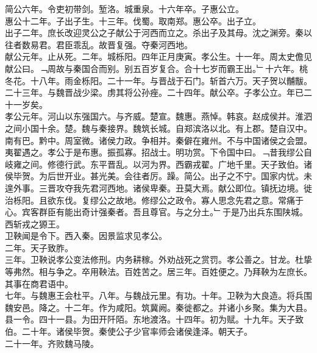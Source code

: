 \documentclass{zhvt-classic}
\begin{document}
\hspace*{2em}简公六年。令吏初带剑。堑洛。城重泉。十六年卒。子惠公立。\\
\hspace*{2em}惠公十二年。子出子生。十三年。伐蜀。取南郑。惠公卒。出子立。\\
\hspace*{2em}出子二年。庶长改迎灵公之子献公于河西而立之。杀出子及其母。沈之渊旁。秦以往者数易君。君臣乖乱。故晋复强。夺秦河西地。\\
\hspace*{2em}献公元年。止从死。二年。城栎阳。四年正月庚寅。孝公生。十一年。周太史儋见献公曰。﹁周故与秦国合而别。别五百岁复合。合十七岁而霸王出。﹂十六年。桃冬花。十八年。雨金栎阳。二十一年。与晋战于石门。斩首六万。天子贺以黼黻。二十三年。与魏晋战少梁。虏其将公孙痤。二十四年。献公卒。子孝公立。年已二十一岁矣。\\
\hspace*{2em}孝公元年。河山以东强国六。与齐威。楚宣。魏惠。燕悼。韩哀。赵成侯并。淮泗之间小国十余。楚。魏与秦接界。魏筑长城。自郑滨洛以北。有上郡。楚自汉中。南有巴。黔中。周室微。诸侯力政。争相并。秦僻在雍州。不与中国诸侯之会盟。夷翟遇之。孝公于是布惠。振孤寡。招战士。明功赏。下令国中曰。﹁昔我缪公自岐雍之间。修德行武。东平晋乱。以河为界。西霸戎翟。广地千里。天子致伯。诸侯毕贺。为后世开业。甚光美。会往者厉。躁。简公。出子之不宁。国家内忧。未遑外事。三晋攻夺我先君河西地。诸侯卑秦。丑莫大焉。献公即位。镇抚边境。徙治栎阳。且欲东伐。复缪公之故地。修缪公之政令。寡人思念先君之意。常痛于心。宾客群臣有能出奇计强秦者。吾且尊官。与之分土。﹂于是乃出兵东围陕城。西斩戎之獂王。\\
\hspace*{2em}卫鞅闻是令下。西入秦。因景监求见孝公。\\
\hspace*{2em}二年。天子致胙。\\
\hspace*{2em}三年。卫鞅说孝公变法修刑。内务耕稼。外劝战死之赏罚。孝公善之。甘龙。杜挚等弗然。相与争之。卒用鞅法。百姓苦之。居三年。百姓便之。乃拜鞅为左庶长。其事在商君语中。\\
\hspace*{2em}七年。与魏惠王会杜平。八年。与魏战元里。有功。十年。卫鞅为大良造。将兵围魏安邑。降之。十二年。作为咸阳。筑冀阙。秦徙都之。并诸小乡聚。集为大县。县一令。四十一县。为田开阡陌。东地渡洛。十四年。初为赋。十九年。天子致伯。二十年。诸侯毕贺。秦使公子少官率师会诸侯逢泽。朝天子。\\
\hspace*{2em}二十一年。齐败魏马陵。\\
\end{document}
